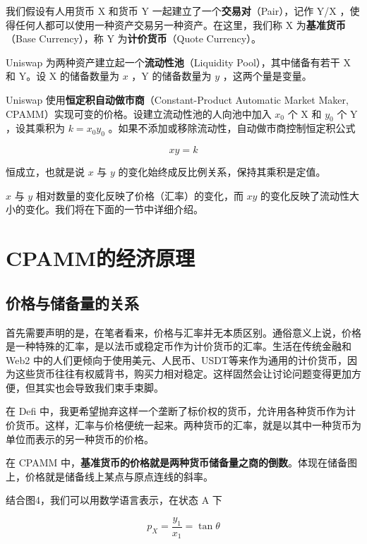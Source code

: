 \documentclass[12pt, a4paper, oneside]{ctexart}
\begin{document}
我们假设有人用货币 X 和货币 Y 一起建立了一个\textbf{交易对}（Pair），记作 Y/X ，使得任何人都可以使用一种资产交易另一种资产。在这里，我们称 X 为\textbf{基准货币}（Base Currency），称 Y 为\textbf{计价货币}（Quote Currency）。

Uniswap 为两种资产建立起一个\textbf{流动性池}（Liquidity Pool），其中储备有若干 X 和 Y。设 X 的储备数量为 $x$ ，Y 的储备数量为 $y$ ，这两个量是变量。

Uniswap 使用\textbf{恒定积自动做市商}（Constant-Product Automatic Market Maker, CPAMM）实现可变的价格。设建立流动性池的人向池中加入 $x_0$ 个 X 和 $y_0$ 个 Y ，设其乘积为 $k=x_0y_0$ 。如果不添加或移除流动性，自动做市商控制恒定积公式

\begin{equation}
    xy=k 
\end{equation}

\noindent 恒成立，也就是说 $x$ 与 $y$ 的变化始终成反比例关系，保持其乘积是定值。

$x$ 与 $y$ 相对数量的变化反映了价格（汇率）的变化，而 $xy$ 的变化反映了流动性大小的变化。我们将在下面的一节中详细介绍。

\section{CPAMM的经济原理}

\subsection{价格与储备量的关系}

首先需要声明的是，在笔者看来，价格与汇率并无本质区别。通俗意义上说，价格是一种特殊的汇率，是以法币或稳定币作为计价货币的汇率。生活在传统金融和 Web2 中的人们更倾向于使用美元、人民币、USDT等来作为通用的计价货币，因为这些货币往往有权威背书，购买力相对稳定。这样固然会让讨论问题变得更加方便，但其实也会导致我们束手束脚。

在 Defi 中，我更希望抛弃这样一个垄断了标价权的货币，允许用各种货币作为计价货币。这样，汇率与价格便统一起来。两种货币的汇率，就是以其中一种货币为单位而表示的另一种货币的价格。

在 CPAMM 中，\textbf{基准货币的价格就是两种货币储备量之商的倒数}。体现在储备图上，价格就是储备线上某点与原点连线的斜率。

结合图4，我们可以用数学语言表示，在状态 A 下

$$
p_X = \frac{y_1}{x_1} = \tan \theta
$$
\end{document}
